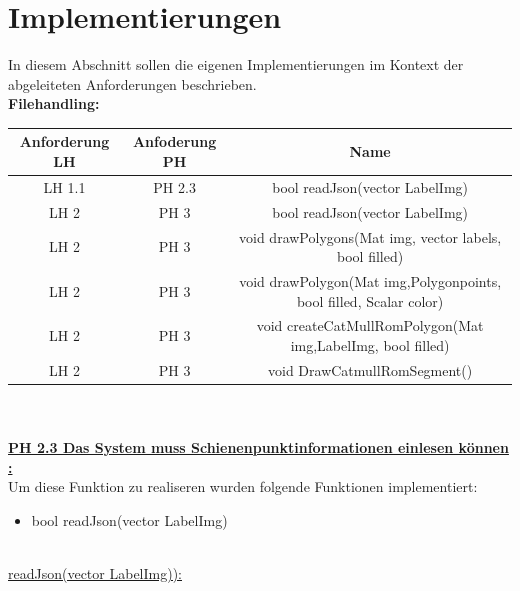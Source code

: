 \documentclass[11pt]{scrartcl}
\begin{document}
\section{Implementierungen}
\label{sec:Implementierungen}

In diesem Abschnitt sollen die eigenen Implementierungen im Kontext der abgeleiteten Anforderungen beschrieben.
\\

\noindent
\textbf{Filehandling:}
\\

\noindent
\begin{tabular}[h]{c|c|c}
Anforderung LH & Anfoderung PH & Name \\
\hline
 LH 1.1 & PH 2.3 & bool  readJson(vector LabelImg)\\
LH 2 & PH 3 & bool readJson(vector LabelImg)\\
LH 2 & PH 3 &void drawPolygons(Mat img, vector labels, bool filled)\\
LH 2 & PH 3 & void drawPolygon(Mat img,Polygonpoints, bool filled, Scalar color)\\
LH 2 & PH 3 &void createCatMullRomPolygon(Mat img,LabelImg, bool filled)\\
LH 2 & PH 3 &void DrawCatmullRomSegment()\\

\end{tabular}
\\
\\

\noindent
\underline{\textbf{PH 2.3 Das System muss Schienenpunktinformationen einlesen können :}}
\\

\noindent
Um diese Funktion zu realiseren wurden folgende Funktionen implementiert:
\begin{itemize}
	\item bool readJson(vector LabelImg)
\end{itemize}

\noindent
\\
\noindent
\underline{readJson(vector LabelImg)):}
\\
\end{document}
